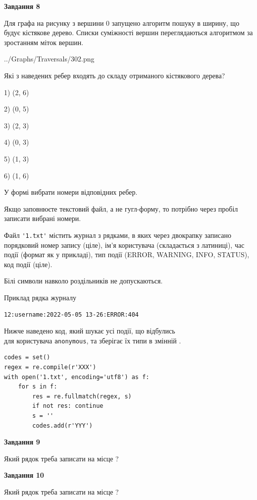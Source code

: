 \documentclass[12pt, ukrainian]{article}
\def\code#1{\Verb!#1!}
\begin{document}
{\begin {large}
{\begin {center}\textbf{Завдання 8}\end {center}}\par
Для графа на рисунку з вершини 0 запущено алгоритм пошуку в ширину, що будує кістякове дерево. Списки суміжності вершин переглядаються алгоритмом за зростанням міток вершин.\par
\begin{center}
	{../Graphs/Traversals/302.png}
\end{center}
\par Які з наведених ребер входять до складу отриманого кістякового дерева?\par
1) (2, 6)\par
2) (0, 5)\par
3) (2, 3)\par
4) (0, 3)\par
5) (1, 3)\par
6) (1, 6)\par
{\vskip 15pt} У формі вибрати номери відповідних ребер.


Якщо заповнюєте текстовий файл, а не гугл-форму, то потрібно через пробіл записа\-ти вибрані номери.\par
\newpage


Файл \code{'1.txt'} містить журнал з рядками, в яких через двокрапку записано поряд\-ко\-вий номер запису (ціле), ім'я користувача (складається з латиниці), час події (фор\-мат як у прикладі), тип події (ERROR, WARNING, INFO, STATUS), код події (ціле).

Білі символи навколо роздільників не допускаються.

Приклад рядка журналу



\begin{verbatim}
12:username:2022-05-05 13-26:ERROR:404
\end{verbatim}


Нижче наведено код, який шукає усі події, що відбулись\\ для користувача \code{anonymous}, та зберігає їх типи в змінній .



\begin{verbatim}
codes = set()
regex = re.compile(r'XXX')
with open('1.txt', encoding='utf8') as f:
    for s in f:
        res = re.fullmatch(regex, s)
        if not res: continue
        s = ''
        codes.add(r'YYY')
\end{verbatim}


{\begin {center}\textbf{Завдання 9}\end {center}}\par
Який рядок треба записати на місце  ?\par
\vspace{5mm}


{\begin {center}\textbf{Завдання 10}\end {center}}\par
Який рядок треба записати на місце  ?\par


\newpage


\end {large}}
\end{document}
